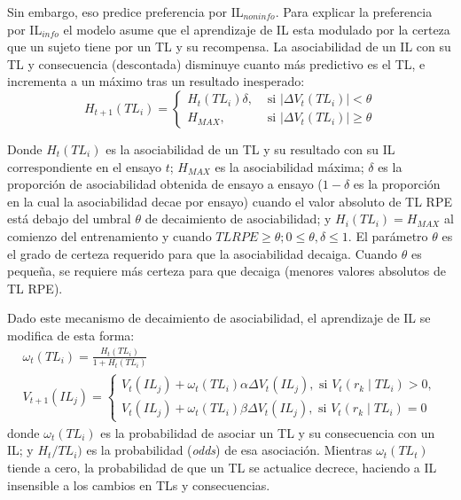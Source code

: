 \documentclass[a4paper,12pt]{article}
\begin{document}
Sin embargo, eso predice preferencia por IL$_{noninfo}$. Para explicar la preferencia por IL$_{info}$ el modelo asume que el aprendizaje de IL esta modulado por la certeza que un sujeto tiene por un TL y su recompensa. La asociabilidad de un IL con su TL y consecuencia (descontada) disminuye cuanto más predictivo es el TL, e incrementa a un máximo tras un resultado inesperado:
$$
H_{t+1}\left(T L_{i}\right)=\left\{\begin{array}{ll}
	H_{t}\left(T L_{i}\right) \delta, & \mbox { si }\left|\Delta V_{t}\left(T L_{i}\right)\right|<\theta \\
H_{M A X}, & \mbox { si }\left|\Delta V_{t}\left(T L_{i}\right)\right| \geq \theta
\end{array}\right.
$$

Donde $H_t(TL_i)$ es la asociabilidad de un TL y su resultado con su IL correspondiente en el ensayo $t$; $H_{MAX}$ es la asociabilidad máxima; $\delta$ es la proporción de asociabilidad obtenida de ensayo a ensayo ($1-\delta$ es la proporción en la cual la asociabilidad decae por ensayo) cuando el valor absoluto de TL RPE está debajo del umbral $\theta$ de decaimiento de asociabilidad; y $H_i(TL_i)=H_{MAX}$ al comienzo del entrenamiento y cuando $TL RPE \geq \theta; 0 \leq \theta, \delta \leq 1$. El parámetro $\theta$ es el grado de certeza requerido para que la asociabilidad decaiga. Cuando $\theta$ es pequeña, se requiere más certeza para que decaiga (menores valores absolutos de TL RPE).

Dado este mecanismo de decaimiento de asociabilidad, el aprendizaje de IL se modifica de esta forma:
$$
\begin{array}{l}
	\omega_{t}\left(T L_{i}\right)=\frac{H_{t}\left(T L_{i}\right)}{1+H_{t}\left(T L_{i}\right)} \\
	V_{t+1}\left(I L_{j}\right)=\left\{\begin{array}{l}
		V_{t}\left(I L_{j}\right)+\omega_{t}\left(T L_{i}\right) \alpha \Delta V_{t}\left(I L_{j}\right), \mbox { si } V_{t}\left(r_{k} \mid T L_{i}\right)>0, \\
	V_{t}\left(I L_{j}\right)+\omega_{t}\left(T L_{i}\right) \beta \Delta V_{t}\left(I L_{j}\right), \mbox { si } V_{t}\left(r_{k} \mid T L_{i}\right)=0
\end{array}\right.
\end{array}
$$
donde $\omega_t(TL_i)$ es la probabilidad de asociar un TL y su consecuencia con un IL; y $H_t/TL_i)$ es la probabilidad ({\slshape odds}) de esa asociación. Mientras $\omega_t(TL_t)$ tiende a cero, la probabilidad de que un TL se actualice decrece, haciendo a IL insensible a los cambios en TLs y consecuencias.
\end{document}
